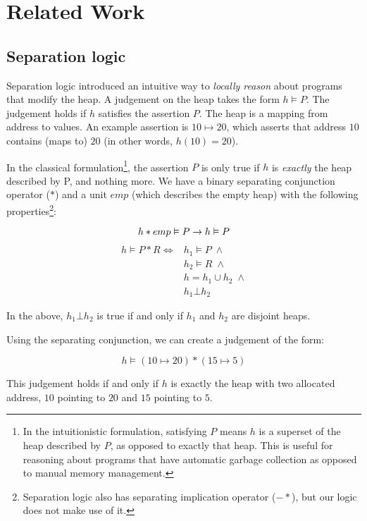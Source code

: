 \section{Related Work}

\subsection{Separation logic}
Separation logic\cite{reynolds2002separation} introduced an intuitive way to
\textit{locally reason} about programs that modify the heap. A judgement on the
heap takes the form $h \vDash P$. The judgement holds if $h$ satisfies the
assertion $P$. The heap is a mapping from address to values. An example
assertion is $10 \mapsto 20$, which asserts that address $10$ contains (maps to)
$20$ (in other words, $h(10) = 20$).

In the classical formulation\footnote{In the intuitionistic formulation,
satisfying $P$ means $h$ is a superset of the heap described by $P$, as opposed
to exactly that heap. This is useful for reasoning about programs that have
automatic garbage collection as opposed to manual memory management.}, the
assertion $P$ is only true if $h$ is \textit{exactly} the heap described by P,
and nothing more. We have a binary separating conjunction operator ($\ast$) and
a unit $emp$ (which describes the empty heap) with the following
properties\footnote{Separation logic also has separating implication operator
($-\!\!\ast$), but our logic does not make use of it.}:

\[
    h \ast emp \vDash P \rightarrow h \vDash P \\
\]
\begin{align*}
    h \vDash P \ast R \iff &h_1 \vDash P \; \wedge \\
		           &h_2 \vDash R \; \wedge \\
		           &h = h_1 \cup h_2 \; \wedge \\
			   &h_1 \bot h_2
\end{align*}

In the above, $h_1 \bot h_2$ is true if and only if $h_1$ and $h_2$ are disjoint heaps.


Using the separating conjunction, we can create a judgement of the form:

\[ h \vDash (10\mapsto20) * (15\mapsto5) \]

This judgement holds if and only if $h$ is exactly the heap with two allocated
address, $10$ pointing to $20$ and $15$ pointing to $5$.

